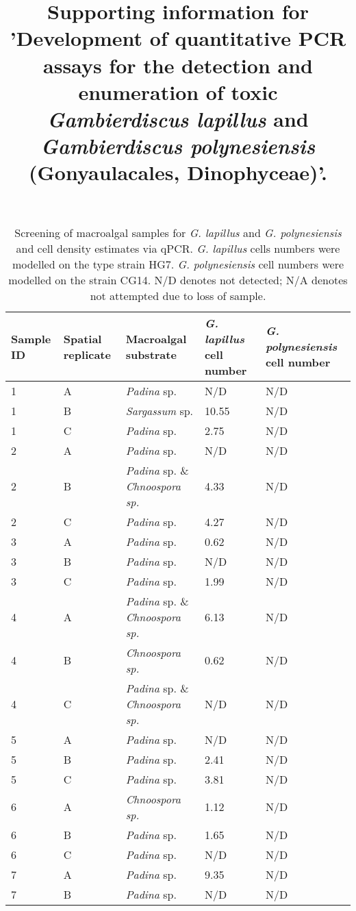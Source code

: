 \documentclass[12pt]{article}
\title{Supporting information for 'Development of quantitative PCR assays for the detection and enumeration of toxic \emph{Gambierdiscus lapillus} and \emph{Gambierdiscus polynesiensis} (Gonyaulacales, Dinophyceae)'.}
\date{}
\begin{document}
\maketitle
\FloatBarrier
\begin{longtable}{ | p{2cm} | p{2cm} | p{3cm} | p{3.5cm} | p{3.5cm} | }
\caption{Screening of macroalgal samples for \emph{G. lapillus} and \emph{G. polynesiensis} and cell density estimates via qPCR. \emph{G. lapillus} cells numbers were modelled on the type strain HG7. \emph{G. polynesiensis} cell numbers were modelled on the strain CG14. N/D denotes not detected; N/A denotes not attempted due to loss of sample.}\\
\hline
\label{tbl:MacroalgaeTable}
\textbf{Sample ID}&\textbf{Spatial replicate}&\textbf{Macroalgal substrate}&\textbf{\textit{G. lapillus} cell number}&\textbf{\textit{G. polynesiensis} cell number}\\
\hline
1&A&\emph{Padina} sp.&N/D&N/D\\
\hline
1&B&\emph{Sargassum} sp.&10.55
&N/D\\
\hline
1&C&\emph{Padina} sp.&2.75
&N/D\\
\hline
2&A&\emph{Padina} sp.&N/D&N/D\\
\hline
2&B&\emph{Padina} sp. \& \emph{Chnoospora sp.}&4.33
&N/D\\
\hline
2&C&\emph{Padina} sp.&4.27
&N/D\\
\hline
3&A&\emph{Padina} sp.&0.62
&N/D\\
\hline
3&B&\emph{Padina} sp.&N/D&N/D\\
\hline
3&C&\emph{Padina} sp.&1.99
&N/D\\
\hline
4&A&\emph{Padina} sp. \& \emph{Chnoospora sp.}&6.13
&N/D\\
\hline
4&B&\emph{Chnoospora sp.}&0.62
&N/D\\
\hline
4&C&\emph{Padina} sp. \& \emph{Chnoospora sp.}&N/D&N/D\\
\hline
5&A&\emph{Padina} sp.&N/D&N/D\\
\hline
5&B&\emph{Padina} sp.&2.41
&N/D\\
\hline
5&C&\emph{Padina} sp.&3.81
&N/D\\
\hline
6&A&\emph{Chnoospora sp.}&1.12
&N/D\\
\hline
6&B&\emph{Padina} sp.&1.65
&N/D\\
\hline
6&C&\emph{Padina} sp.&N/D&N/D\\
\hline
7&A&\emph{Padina} sp.&9.35
&N/D\\
\hline
7&B&\emph{Padina} sp.&N/D&N/D\\

\end{longtable}
\end{document}

